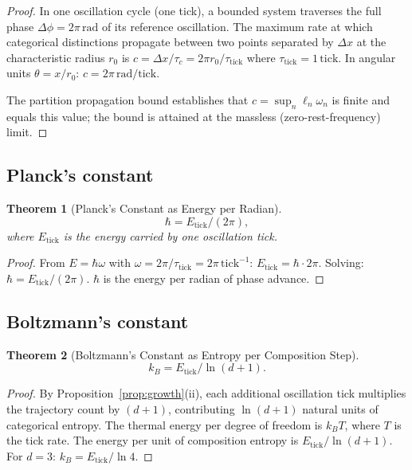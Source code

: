 \documentclass[twocolumn,10pt,a4paper]{article}
\theoremstyle{thmstyle}
\newtheorem{theorem}{Theorem}[section]
\theoremstyle{definition}
\theoremstyle{remark}
\begin{document}
\begin{proof}
In one oscillation cycle (one tick), a bounded system traverses the full
phase $\Delta\phi = 2\pi\,\mathrm{rad}$ of its reference oscillation.
The maximum rate at which categorical distinctions propagate between two
points separated by $\Delta x$ at the characteristic radius $r_0$
is $c = \Delta x/\tau_c = 2\pi r_0/\tau_{\mathrm{tick}}$ where
$\tau_{\mathrm{tick}} = 1\,\mathrm{tick}$. In angular units
$\theta = x/r_0$: $c = 2\pi\,\mathrm{rad/tick}$.

The partition propagation bound establishes that $c = \sup_n \ell_n \omega_n$
is finite and equals this value; the bound is attained at the massless
(zero-rest-frequency) limit.
\end{proof}

\subsection{Planck's constant}

\begin{theorem}[Planck's Constant as Energy per Radian]
\label{thm:hbar}
\begin{equation}
\hbar = E_{\mathrm{tick}}/(2\pi),
\label{eq:hbar}
\end{equation}
where $E_{\mathrm{tick}}$ is the energy carried by one oscillation tick.
\end{theorem}

\begin{proof}
From $E = \hbar\omega$ with $\omega = 2\pi/\tau_{\mathrm{tick}} = 2\pi\,\mathrm{tick}^{-1}$:
$E_{\mathrm{tick}} = \hbar \cdot 2\pi$. Solving: $\hbar = E_{\mathrm{tick}}/(2\pi)$.
$\hbar$ is the energy per radian of phase advance.
\end{proof}

\subsection{Boltzmann's constant}

\begin{theorem}[Boltzmann's Constant as Entropy per Composition Step]
\label{thm:kB}
\begin{equation}
k_B = E_{\mathrm{tick}}/\ln(d+1).
\label{eq:kB}
\end{equation}
\end{theorem}

\begin{proof}
By Proposition~\ref{prop:growth}(ii), each additional oscillation tick
multiplies the trajectory count by $(d+1)$, contributing $\ln(d+1)$ natural
units of categorical entropy. The thermal energy per degree of freedom is
$k_B T$, where $T$ is the tick rate. The energy per unit of composition
entropy is $E_{\mathrm{tick}}/\ln(d+1)$.
For $d = 3$: $k_B = E_{\mathrm{tick}}/\ln 4$.
\end{proof}
\end{document}
